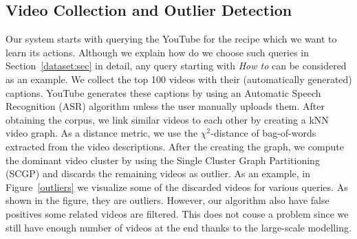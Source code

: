 \subsection{Video Collection and Outlier Detection}
\label{filter}
Our system starts with querying the YouTube for the recipe which we want to learn its actions. Although we explain how do we choose such queries in Section~\ref{dataset:sec} in detail, any query starting with \emph{How to} can be considered as an example. We collect the top 100 videos with their (automatically generated) captions. YouTube generates these captions by using an Automatic Speech Recognition (ASR) algorithm unless the user manually uploads them. After obtaining the corpus, we link similar videos to each other by creating a kNN video graph. As a distance metric, we use the $\chi^2$-distance of bag-of-words extracted from the video descriptions. After the creating the graph, we compute the dominant video cluster by using the Single Cluster Graph Partitioning (SCGP)\cite{scgp} and discards the remaining videos as outlier. As an example, in Figure~\ref{outliers} we visualize some of the discarded videos for various queries. As shown in the figure, they are outliers. However, our algorithm also have false positives \ie some related videos are filtered. This does not couse a problem since we still have enough number of videos at the end thanks to the large-scale modelling. 
